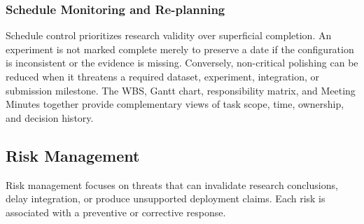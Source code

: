 \documentclass[12pt,a4paper]{report}
\begin{document}
\subsubsection{Schedule Monitoring and Re-planning}
Schedule control prioritizes research validity over superficial completion. An experiment is not marked complete merely to preserve a date if the configuration is inconsistent or the evidence is missing. Conversely, non-critical polishing can be reduced when it threatens a required dataset, experiment, integration, or submission milestone. The WBS, Gantt chart, responsibility matrix, and Meeting Minutes together provide complementary views of task scope, time, ownership, and decision history.\par
\subsection{Risk Management}
Risk management focuses on threats that can invalidate research conclusions, delay integration, or produce unsupported deployment claims. Each risk is associated with a preventive or corrective response.\par
\begingroup
\scriptsize
\setlength{\tabcolsep}{2pt}
\renewcommand{\arraystretch}{1.16}
\end{document}
